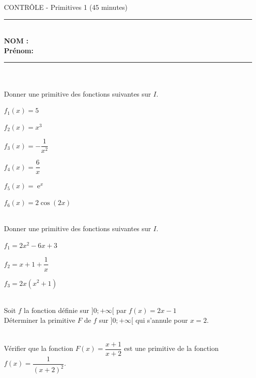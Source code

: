 \documentclass[11pt,a4paper]{article}
\DeclareMathOperator{\e}{e}
\newcommand{\cadreblanc}[1]{%
\medskip\framebox[\linewidth][c]{%
\rule{0mm}{#1mm}}\par
\medskip}
\begin{document}
\center \LARGE{CONTRÔLE - Primitives 1  (45 minutes)}\
\\[0,3cm]

\normalsize

\hrule\
\\[0,2cm]

\flushleft \textbf{NOM :\\
Prénom:\\[0,2cm]
}
\hrule\
\\[0,2cm]






 
 \\[2pt]
 
 Donner une primitive des fonctions suivantes sur $I$. 
 
 \begin{multicols}{6}
\begin{center}
{
$f_1(x)=5$ \\
\cadreblanc {10}
$f_2(x)=x^3$\\
\cadreblanc {10}
$f_3(x)=-\dfrac{1}{x^2}$\\
\cadreblanc {10}
$f_4(x)=\dfrac{6}{x}$\\
\cadreblanc {10}
$f_5(x)=\e^x$\\
\cadreblanc {10}
$f_6(x)=2\cos(2x)$\\
\cadreblanc {10}
}
\end{center}
\end{multicols}

\\[2pt]
 Donner une primitive des fonctions suivantes sur $I$. 
\begin{multicols}{3}
  \begin{center}
  {
  $f_1 = 2x^2-6x+3$\\
  \cadreblanc {25}
  $f_2 = x+1+\dfrac{1}{x}$
  \cadreblanc{25}
  $f_3 = 2x(x^2+1)$\\
  \cadreblanc {25}
  }
  \end{center}
\end{multicols}

\\[2pt]

Soit $f$ la fonction définie sur $]0;+\infty[$ par $f(x)=2x-1$\\
Déterminer la primitive $F$ de $f$ sur $]0;+\infty[$ qui s'annule pour $x=2$.\\
\cadreblanc{40}

\\[2pt]
Vérifier que la fonction $F(x)=\dfrac{x+1}{x+2}$ est une primitive de la fonction $f(x)=\dfrac{1}{(x+2)^2}$.
\\
\cadreblanc {50}
\end{document}
